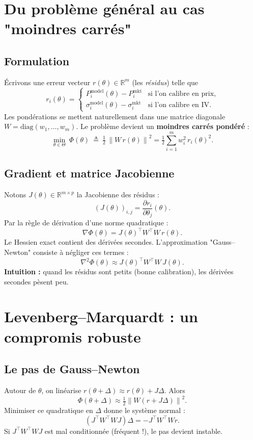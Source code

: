 \documentclass[11pt,a4paper]{report}
\newcommand{\R}{\mathbb{R}}
\newcommand{\1}{\mathbbm{1}}
\newcommand{\norm}[1]{\left\|#1\right\|}
\newcommand{\pd}[2]{\frac{\partial #1}{\partial #2}}
\theoremstyle{definition}
\theoremstyle{plain}
\theoremstyle{remark}
\begin{document}
\section{Du problème général au cas "moindres carrés"}

\subsection{Formulation}
Écrivons une erreur vecteur $r(\theta)\in\R^m$ (les \emph{résidus}) telle que
\[
r_i(\theta)=\begin{cases}
P_i^{\mathrm{model}}(\theta)-P_i^{\mathrm{mkt}} & \text{si l'on calibre en prix},\\
\sigma_i^{\mathrm{model}}(\theta)-\sigma_i^{\mathrm{mkt}} & \text{si l'on calibre en IV}.
\end{cases}
\]
Les pondérations se mettent naturellement dans une matrice diagonale $W=\mathrm{diag}(w_1,\dots,w_m)$.
Le problème devient un \textbf{moindres carrés pondéré} :
\[
\min_{\theta\in\Theta}\ \Phi(\theta)\ \triangleq\ \tfrac12\,\norm{W\,r(\theta)}^2
=\tfrac12\sum_{i=1}^m w_i^2\,r_i(\theta)^2.
\]

\subsection{Gradient et matrice Jacobienne}
Notons $J(\theta)\in\R^{m\times p}$ la Jacobienne des résidus :
\[(J(\theta))_{i,j}=\pd{r_i}{\theta_j}(\theta).
\]
Par la règle de dérivation d'une norme quadratique :
\[
\nabla\Phi(\theta)=J(\theta)^\top W^\top W\, r(\theta).
\]
Le Hessien exact contient des dérivées secondes. L'approximation "Gauss--Newton" consiste à négliger ces termes :
\[
\nabla^2\Phi(\theta)\approx J(\theta)^\top W^\top W\,J(\theta).
\]
\textbf{Intuition :} quand les résidus sont petits (bonne calibration), les dérivées secondes pèsent peu.

\section{Levenberg--Marquardt : un compromis robuste}

\subsection{Le pas de Gauss--Newton}
Autour de $\theta$, on linéarise $r(\theta+\Delta)\approx r(\theta)+J\Delta$.
Alors
\[\Phi(\theta+\Delta)\approx \tfrac12\norm{W(r+J\Delta)}^2.
\]
Minimiser ce quadratique en $\Delta$ donne le système normal :
\[
(J^\top W^\top WJ)\Delta = -J^\top W^\top W r.
\]
Si $J^\top W^\top WJ$ est mal conditionnée (fréquent !), le pas devient instable.
\end{document}
